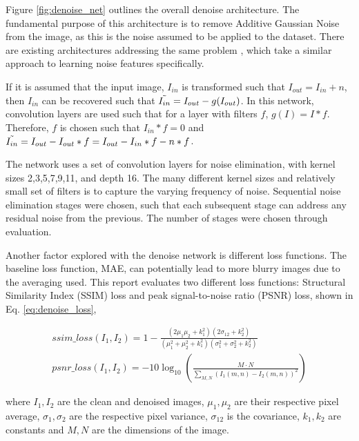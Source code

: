 \documentclass[10pt,twocolumn,letterpaper]{article}
\begin{document}
Figure \ref{fig:denoise_net} outlines the overall denoise architecture. The fundamental purpose of this architecture is to remove Additive Gaussian Noise from the image, as this is the noise assumed to be applied to the dataset. There are existing architectures addressing the same problem \cite{ZhangZCM016}, which take a similar approach to learning noise features specifically. 

If it is assumed that the input image, $I_{in}$ is transformed such that $I_{out} = I_{in} + n$, then $I_{in}$ can be recovered such that $\Tilde{I_{in}} = I_{out} - g(I_{out})$. In this network, convolution layers are used such that for a layer with filters $f$, $g(I) = I * f$. Therefore, $f$ is chosen such that $I_{in} * f = 0$ and $\Tilde{I_{in}} = I_{out} - I_{out}*f = I_{out} - I_{in}*f - n*f$.

The network uses a set of convolution layers for noise elimination, with kernel sizes 2,3,5,7,9,11, and depth 16. The many different kernel sizes and relatively small set of filters is to capture the varying frequency of noise.
Sequential noise elimination stages were chosen, such that each subsequent stage can address any residual noise from the previous. 
The number of stages were chosen through evaluation.


Another factor explored with the denoise network is different loss functions. The baseline loss function, MAE, can potentially lead to more blurry images due to the averaging used. This report evaluates two different loss functions: Structural Similarity Index (SSIM) loss and peak signal-to-noise ratio (PSNR) loss, shown in Eq. \ref{eq:denoise_loss},

\begin{equation}
\begin{split}
     ssim\_loss(I_1,I_2) = 1 - \frac{ (2\mu_1 \mu_2 + k_1^2)(2\sigma_{12} + k_2^2) }{ (\mu_1^2 + \mu_2^2 + k_1^2)(\sigma_1^2 + \sigma_2^2 + k_2^2) } 
     \\
 psnr\_loss(I_1,I_2) = - 10 \log_{10} \left( \frac{ M \cdot N }{ \sum_{M,N} ( I_1 (m,n) - I_2 (m,n) )^2 } \right)
\end{split}
\label{eq:denoise_loss} 
\end{equation}

where $I_1,I_2$ are the clean and denoised images, $\mu_1,\mu_2$ are their respective pixel average, $\sigma_1,\sigma_2$ are the respective pixel variance, $\sigma_{12}$ is the covariance, $k_1, k_2$ are constants and $M,N$ are the dimensions of the image.
\end{document}
